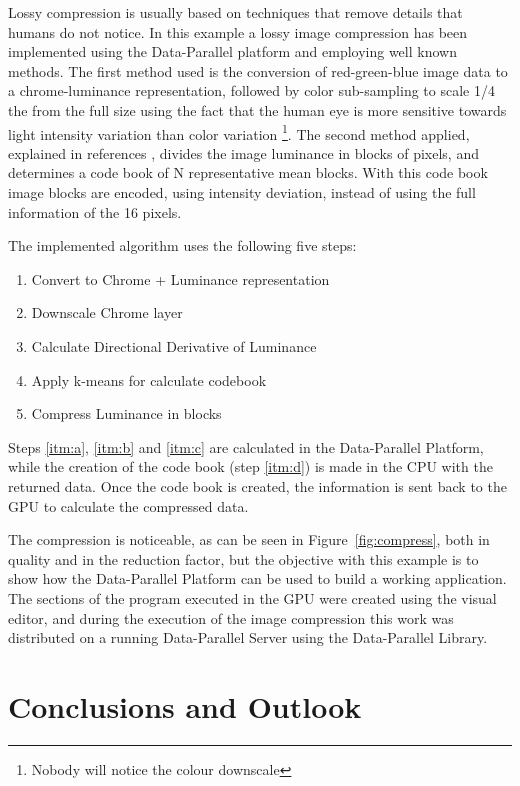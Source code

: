 \documentclass[conference]{IEEEtran}
\begin{document}
Lossy compression is usually based on techniques that remove details that humans
do not notice. In this example a lossy image compression has been implemented
using the Data-Parallel platform and employing well known methods.  The first
method used is the conversion of red-green-blue image data to a chrome-luminance
representation, followed by color sub-sampling to scale 1/4 the from the full
size using the fact that the human eye is more sensitive towards light intensity
variation than color variation \footnote{Nobody will notice the colour
  downscale}. The second method applied, explained in references
\cite{citeulike:5759381} \cite{qiu1995}, divides the image luminance in blocks
of  pixels, and determines a code book of N representative mean blocks.
With this code book image blocks are encoded, using intensity deviation, instead
of using the full information of the 16 pixels.

The implemented algorithm uses the following five steps:

\begin{enumerate}
\item \label{itm:a}Convert to Chrome + Luminance representation
\item \label{itm:b}Downscale Chrome layer
\item \label{itm:c}Calculate Directional Derivative of Luminance
\item \label{itm:d}Apply k-means for calculate codebook
\item \label{itm:e}Compress Luminance in blocks
\end{enumerate}

Steps \ref{itm:a}, \ref{itm:b} and \ref{itm:c} are calculated in the
Data-Parallel Platform, while the creation of the code book (step
\ref{itm:d}) is made in the CPU with the returned data.  Once the code book is
created, the information is sent back to the GPU to calculate the compressed
data.

The compression is noticeable, as can be seen in Figure~\ref{fig:compress}, both
in quality and in the reduction factor, but the objective with this example is to show how
the Data-Parallel Platform can be used to build a working application.  The
sections of the program executed in the GPU were created using the visual
editor, and during the execution of the image compression this work was
distributed on a running Data-Parallel Server using the Data-Parallel Library.

\section{Conclusions and Outlook}
\end{document}
